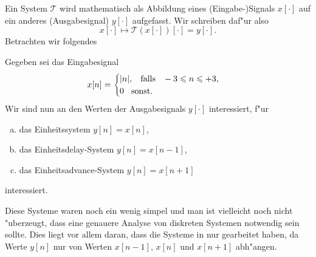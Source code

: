 Ein System $\mathcal{T}$ wird mathematisch als Abbildung eines (Eingabe-)Signals $x[\cdot]$ auf ein anderes (Ausgabesignal) $y[\cdot]$ aufgefasst. Wir schreiben daf"ur also
%
\begin{equation}
    x[\cdot] \mapsto \mathcal{T}(x[\cdot])[\cdot] = y[\cdot].
\end{equation}
%
Betrachten wir folgendes
\begin{Bsp}\label{ex:simple_sys}
    Gegeben sei das Eingabesignal
    \[
    x[n] = \begin{cases}
        {\left| n \right|}, {\hspace{3mm} \text{falls} \hspace{3mm}} -3 \leqslant n \leqslant +3, \\
        0 {\hspace{3mm} \text{sonst.} \hspace{3mm}}
    \end{cases}
    \]
    Wir sind nun an den Werten der Ausgabesignals $y[\cdot]$ interessiert, f"ur
    \begin{enumerate}[a)]
        \item das Einheitssystem $y[n] = x[n]$,
        \item das Einheitsdelay-System $y[n] = x[n-1]$,
        \item das Einheitsadvance-System $y[n] = x[n+1]$
    \end{enumerate}
    interessiert.
\end{Bsp}
Diese Systeme waren noch ein wenig simpel und man ist vielleicht noch nicht "uberzeugt, dass eine genauere Analyse von diskreten Systemen notwendig sein sollte.
Dies liegt vor allem daran, dass die Systeme in  nur  gearbeitet haben, da Werte $y[n]$ nur von Werten $x[n-1]$, $x[n]$ und $x[n+1]$ abh"angen.

